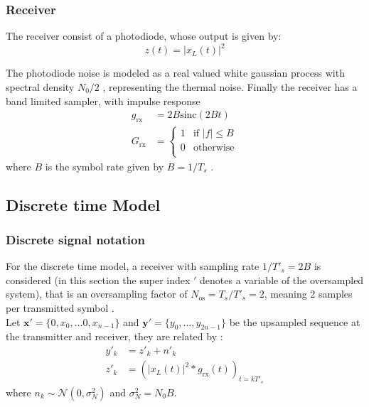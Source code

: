 \subsubsection{Receiver}
The receiver consist of a photodiode, whose output is given by:
\begin{equation}
z(t)=|x_L(t)|^2
\end{equation}

The photodiode noise is modeled as a real valued white gaussian process with spectral density $N_0/2$ \cite{Plabst_DD}, representing the thermal noise. Finally the receiver has a band limited sampler, with impulse response  
\begin{align}
	g_\text{rx}&=2B\text{sinc}\left(2Bt\right)\\
	G_\text{rx}&=\left\{
\begin{array}{ll}
1  &  \text{if }|f|\leq B   \\
0  &  \text{otherwise} \\
\end{array}
\right.
\end{align}
where $B$ is the symbol rate given by $B=1/T_s$ \cite{Plabst_DD}.



\subsection{Discrete time Model}

\subsubsection{Discrete signal notation}
For the discrete time model, a receiver with sampling rate $1/T'_s=2B$ is considered (in this section the super index $'$ denotes a variable of the oversampled system), that is an oversampling factor of $N_\text{os}=T_s/T'_s=2$, meaning 2 samples per transmitted symbol \cite{Plabst_DD}.\\

Let $\bm x'=\{0,x_0,\dotsc0,x_{n-1}\}$ and $\bm y'=\{y_0,\dotsc,y_{2n-1}\}$ be the upsampled sequence at the transmitter and receiver, they are related by \cite{Plabst_DD}:
\begin{align}
y'_k&=z'_k+n'_k \\
z'_k&=\left(|x_L(t)|^2*g_\text{rx}(t)\right)_{t=kT'_s}
\end{align}
where $n_k\sim\mathcal N(0,\sigma_N^2)$ and $\sigma_N^2=N_0B$.\\

